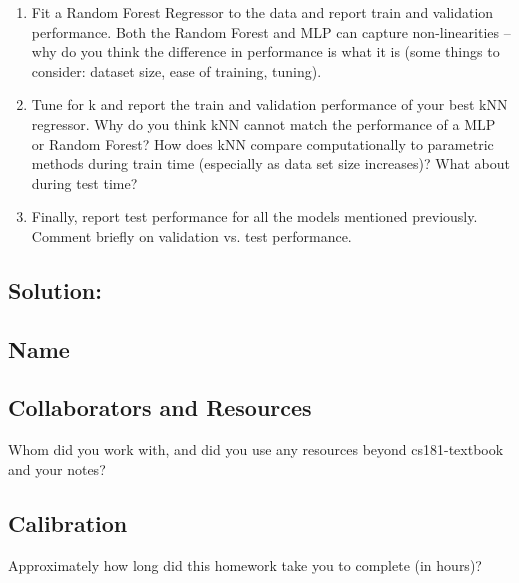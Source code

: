 \documentclass[submit]{harvardml}
\begin{document}
\begin{problem}
\begin{enumerate}
  \item Fit a Random Forest Regressor to the data and report train and validation performance. Both the Random Forest and MLP can capture non-linearities -- why do you think the difference in performance is what it is (some things to consider: dataset size, ease of training, tuning). 

  \item Tune for k and report the train and validation performance of your best kNN regressor. Why do you think kNN cannot match the performance of a MLP or Random Forest? How does kNN compare computationally to parametric methods during train time (especially as data set size increases)? What about during test time?
  
  \item Finally, report test performance for all the models mentioned previously. Comment briefly on validation vs. test performance.

\end{enumerate}

\end{problem}


\subsection*{Solution:}

\newpage
\subsection*{Name}

\subsection*{Collaborators and Resources}
Whom did you work with, and did you use any resources beyond cs181-textbook and your notes?

\subsection*{Calibration}
Approximately how long did this homework take you to complete (in hours)? 
\end{document}
